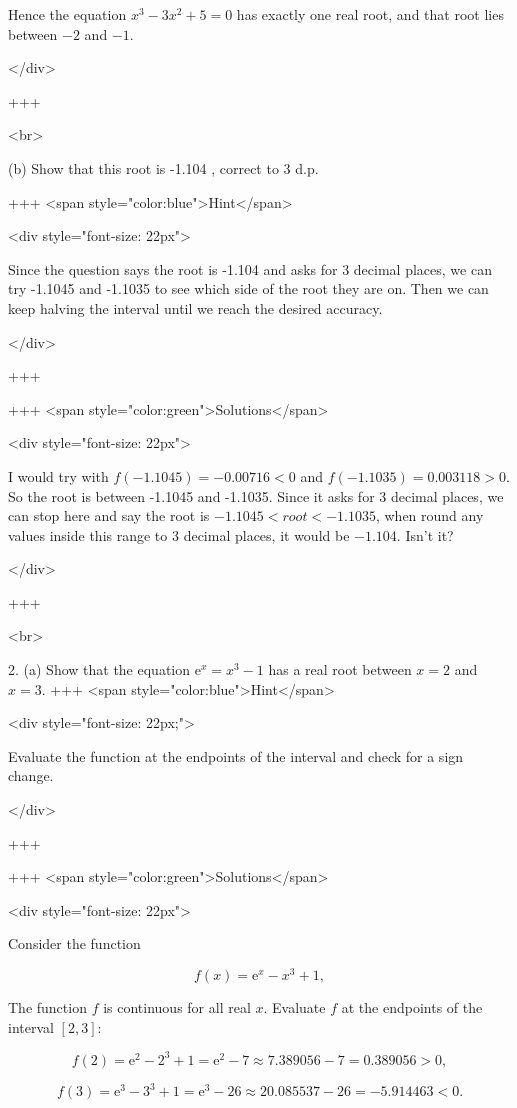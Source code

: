 Hence the equation $x^{3}-3x^{2}+5=0$ has exactly one real root, and that root lies between $-2$ and $-1$.

</div>

+++

<br>

(b) Show that this root is -1.104 , correct to 3 d.p.

+++ <span style="color:blue">Hint</span>

<div style="font-size: 22px">

Since the question says the root is -1.104 and asks for 3 decimal places, we can try -1.1045 and -1.1035 to see which side of the root they are on. Then we can keep halving the interval until we reach the desired accuracy.

</div>

+++

+++ <span style="color:green">Solutions</span>

<div style="font-size: 22px">

I would try with $f(-1.1045) = -0.00716 < 0$ and $f(-1.1035) = 0.003118 > 0$. So the root is between -1.1045 and -1.1035.
Since it asks for 3 decimal places, we can stop here and say the root is $-1.1045 < root < -1.1035$, when round any values inside this range to 3 decimal places, it would be $-1.104$. Isn't it?

</div> 

+++

<br>

2. (a) Show that the equation $\mathrm{e}^{x}=x^{3}-1$ has a real root between $x=2$ and $x=3$.
+++ <span style="color:blue">Hint</span>

<div style="font-size: 22px;">

Evaluate the function at the endpoints of the interval and check for a sign change.

</div>

+++

+++ <span style="color:green">Solutions</span>

<div style="font-size: 22px">

Consider the function

$$
f(x)=\mathrm{e}^{x}-x^{3}+1,
$$

The function $f$ is continuous for all real $x$. Evaluate $f$ at the endpoints of the interval $[2,3]$:

$$
f(2)=\mathrm{e}^{2}-2^{3}+1=\mathrm{e}^{2}-7\approx 7.389056-7=0.389056>0,
$$


$$
f(3)=\mathrm{e}^{3}-3^{3}+1=\mathrm{e}^{3}-26\approx 20.085537-26=-5.914463<0.
$$


